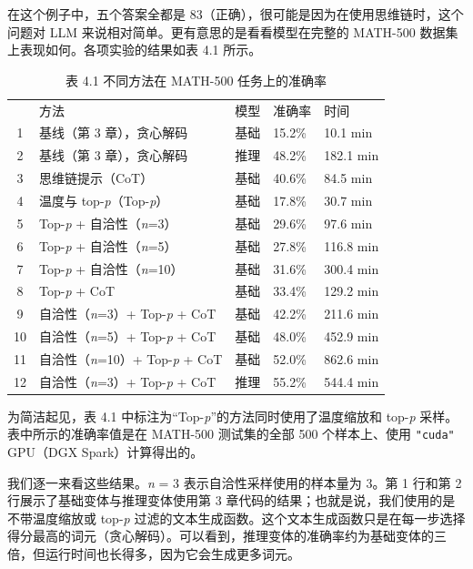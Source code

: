 在这个例子中，五个答案全都是 83（正确），很可能是因为在使用思维链时，这个问题对 LLM 来说相对简单。更有意思的是看看模型在完整的 MATH-500 数据集上表现如何。各项实验的结果如表 4.1 所示。

\begin{table}[htbp]
\centering\small
\centering
\caption{表 4.1 不同方法在 MATH-500 任务上的准确率}
\begin{tabularx}{\linewidth}{@{}c@{}XXXX}
\toprule
 & 方法 & 模型 & 准确率 & 时间 \\
1 & 基线（第 3 章），贪心解码 & 基础 & 15.2\% & 10.1 min \\
2 & 基线（第 3 章），贪心解码 & 推理 & 48.2\% & 182.1 min \\
3 & 思维链提示（CoT） & 基础 & 40.6\% & 84.5 min \\ \addlinespace

4 & 温度与 top-\emph{p}（Top-\emph{p}） & 基础 & 17.8\% & 30.7 min \\
5 & Top-\emph{p} + 自洽性（\emph{n}=3） & 基础 & 29.6\% & 97.6 min \\
6 & Top-\emph{p} + 自洽性（\emph{n}=5） & 基础 & 27.8\% & 116.8 min \\
7 & Top-\emph{p} + 自洽性（\emph{n}=10） & 基础 & 31.6\% & 300.4 min \\ \addlinespace

8 & Top-\emph{p} + CoT & 基础 & 33.4\% & 129.2 min \\
9 & 自洽性（\emph{n}=3）+ Top-\emph{p} + CoT & 基础 & 42.2\% & 211.6 min \\
10 & 自洽性（\emph{n}=5）+ Top-\emph{p} + CoT & 基础 & 48.0\% & 452.9 min \\
11 & 自洽性（\emph{n}=10）+ Top-\emph{p} + CoT & 基础 & 52.0\% & 862.6 min \\
12 & 自洽性（\emph{n}=3）+ Top-\emph{p} + CoT & 推理 & 55.2\% & 544.4 min \\ \bottomrule
\end{tabularx}
\end{table}

为简洁起见，表 4.1 中标注为“Top-\emph{p}”的方法同时使用了温度缩放和 top-\emph{p} 采样。表中所示的准确率值是在 MATH-500 测试集的全部 500 个样本上、使用 \texttt{"}\texttt{cuda}\texttt{"} GPU（DGX Spark）计算得出的。

我们逐一来看这些结果。\emph{n} = 3 表示自洽性采样使用的样本量为 3。第 1 行和第 2 行展示了基础变体与推理变体使用第 3 章代码的结果；也就是说，我们使用的是不带温度缩放或 top-\emph{p} 过滤的文本生成函数。这个文本生成函数只是在每一步选择得分最高的词元（贪心解码）。可以看到，推理变体的准确率约为基础变体的三倍，但运行时间也长得多，因为它会生成更多词元。

